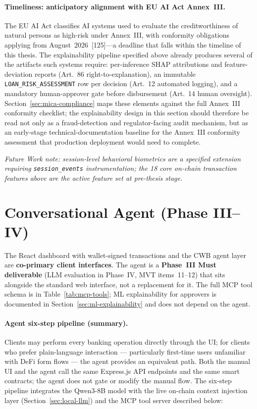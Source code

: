 \documentclass[12pt,a4paper]{report}
\begin{document}
\paragraph{Timeliness: anticipatory alignment with EU AI Act Annex~III.}
The EU AI Act classifies AI systems used to evaluate the creditworthiness
of natural persons as high-risk under Annex~III, with conformity
obligations applying from August~2026~[125]---a deadline that falls
within the timeline of this thesis. The explainability pipeline specified
above already produces several of the artifacts such systems require:
per-inference SHAP attributions and feature-deviation reports (Art.~86
right-to-explanation), an immutable \texttt{LOAN\_RISK\_ASSESSMENT} row per
decision (Art.~12 automated logging), and a mandatory human-approver gate
before disbursement (Art.~14 human oversight). Section~\ref{sec:mica-compliance}
maps these elements against the full Annex~III conformity checklist; the
explainability design in this section should therefore be read not only
as a fraud-detection and regulator-facing audit mechanism, but as an
early-stage technical-documentation baseline for the Annex~III conformity
assessment that production deployment would need to complete.

\noindent\textit{Future Work note: session-level behavioral biometrics are a specified extension requiring \texttt{session\_events} instrumentation; the 18 core on-chain transaction features above are the active feature set at pre-thesis stage.}

\section{Conversational Agent (Phase III--IV)}
\label{sec:optional-agent}

The React dashboard with wallet-signed transactions and the CWB agent layer are \textbf{co-primary client interfaces}. The agent is a \textbf{Phase~III Must deliverable} (LLM evaluation in Phase~IV, MVT items~11--12) that sits alongside the standard web interface, not a replacement for it. The full MCP tool schema is in Table~\ref{tab:mcp-tools}; ML explainability for approvers is documented in Section~\ref{sec:ml-explainability} and does not depend on the agent.

\paragraph{Agent six-step pipeline (summary).} Clients may perform every banking operation directly through the UI; for clients who prefer plain-language interaction --- particularly first-time users unfamiliar with DeFi form flows --- the agent provides an equivalent path. Both the manual UI and the agent call the same Express.js API endpoints and the same smart contracts; the agent does not gate or modify the manual flow. The six-step pipeline integrates the Qwen3-8B model with the live on-chain context injection layer (Section~\ref{sec:local-llm}) and the MCP tool server described below:
\end{document}
